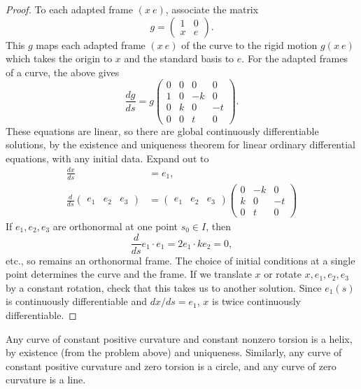 \begin{proof}
To each adapted frame \((x \ e)\), associate the matrix
\[
g=
\begin{pmatrix}
1 & 0 \\
x & e
\end{pmatrix}.
\]
This \(g\) maps each adapted frame \((x \ e)\) of the curve to the rigid motion \(g(x \ e)\) which takes the origin to \(x\) and the standard basis to \(e\).
For the adapted frames of a curve, the above gives
\[
\frac{dg}{ds} = 
g
\begin{pmatrix}
0 & 0 & 0 & 0 \\
1 & 0 & -k & 0 \\
0 & k & 0 & -t \\
0 & 0 & t & 0
\end{pmatrix}.
\]
These equations are linear, so there are global continuously differentiable solutions, by the existence and uniqueness theorem for linear ordinary differential equations, with any initial data.
Expand out to
\begin{align*}
\frac{dx}{ds} &= e_1, \\
\frac{d}{ds}
\begin{pmatrix}
e_1 & e_2 & e_3
\end{pmatrix}
&=
\begin{pmatrix}
e_1 & e_2 & e_3
\end{pmatrix}
\begin{pmatrix}
0 & -k & 0 \\
k & 0 & -t \\
0 & t & 0
\end{pmatrix}
\end{align*}
If \(e_1, e_2, e_3\) are orthonormal at one point \(s_0 \in I\), then
\[
\frac{d}{ds} e_1 \cdot e_1
=
2 e_1 \cdot k e_2 = 0,
\]
etc., so remains an orthonormal frame.
The choice of initial conditions at a single point determines the curve and the frame.
If we translate \(x\) or rotate \(x,e_1,e_2,e_3\) by a constant rotation, check that this takes us to another solution.
Since \(e_1(s)\) is continuously differentiable and \(dx/ds=e_1\), \(x\) is twice continuously differentiable. 
\end{proof}
\begin{example} Any curve of constant positive curvature and constant nonzero torsion is a helix, by existence (from the problem above) and uniqueness.
Similarly, any curve of constant positive curvature and zero torsion is a circle, and any curve of zero curvature is a line.
\end{example}
